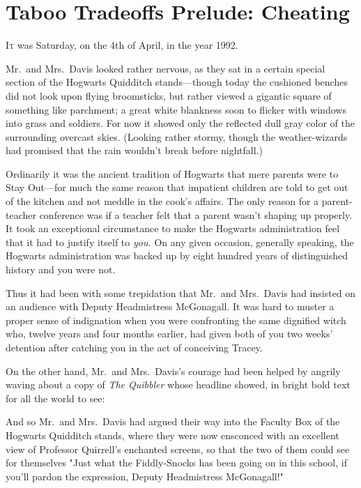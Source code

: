 \chapter{Taboo Tradeoffs Prelude: Cheating}

\lettrine{I}{t} was Saturday, 
on the 4th of April, in the year 1992.

\quad\quad
Mr.~and Mrs.~Davis looked rather nervous, as they sat in a certain special 
section of the Hogwarts Quidditch stands---though today the cushioned benches 
did not look upon flying broomsticks, but rather viewed a gigantic square of 
something like parchment; a great white blankness soon to flicker with windows 
into grass and soldiers. For now it showed only the reflected dull gray color 
of the surrounding overcast skies. (Looking rather stormy, though the 
weather-wizards had promised that the rain wouldn't break before nightfall.)

Ordinarily it was the ancient tradition of Hogwarts that mere parents were to 
Stay Out---for much the same reason that impatient children are told to get out 
of the kitchen and not meddle in the cook's affairs. The only reason for a 
parent-teacher conference was if a teacher felt that a parent wasn't shaping up 
properly. It took an exceptional circumstance to make the Hogwarts 
administration feel that it had to justify itself to \emph{you.} On any given 
occasion, generally speaking, the Hogwarts administration was backed up by 
eight hundred years of distinguished history and you were not.

Thus it had been with some trepidation that Mr.~and Mrs.~Davis had insisted on 
an audience with Deputy Headmistress McGonagall. It was hard to muster a proper 
sense of indignation when you were confronting the same dignified witch who, 
twelve years and four months earlier, had given both of you two weeks' 
detention after catching you in the act of conceiving Tracey.

On the other hand, Mr.~and Mrs.~Davis's courage had been helped by angrily 
waving about a copy of \emph{The Quibbler} whose headline showed, in bright 
bold text for all the world to see:


And so Mr.~and Mrs.~Davis had argued their way into the Faculty Box of the 
Hogwarts Quidditch stands, where they were now ensconced with an excellent view 
of Professor Quirrell's enchanted screens, so that the two of them could see 
for themselves "Just what the Fiddly-Snocks has been going on in this school, 
if you'll pardon the expression, Deputy Headmistress McGonagall!"


